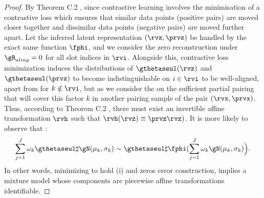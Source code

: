 \documentclass{article} %
\theoremstyle{plain}
\theoremstyle{definition}
\theoremstyle{remark}
\numberwithin{equation}{section}
\begin{document}
\begin{proof}
    By Theorem C.2 \citep{kivva2022identifiability}, since contrastive learning involves the minimisation of a contrastive loss which ensures that similar data points (positive pairs) are moved closer together and dissimilar data points (negative pairs) are moved further apart. Let the inferred latent representation $(\rvz, \prvz)$ be handled by the exact same function $\fphi$, and we consider the zero reconstruction under $\gR_{aling}=0$ for all slot indices in $\rvi$. Alongside this, contrastive loss minimization induces the distributions of \( \gthetaseul(\rvz) \) and \( \gthetaseul(\prvz)\) to become indistinguishable on $i \in \rvi$ to be well-aligned, apart from for $k \notin \rvi$, but as we consider the  on the sufficient partial pairing that will cover this factor $k$ in another pairing sample of the pair $(\rvx,\prvx)$. Thus, according to Theorem C.2 \citep{kivva2022identifiability}, there must exist an invertible affine transformation \( \rvh \) such that \( \rvh(\rvz) \equiv \prvz \rvz) \). It is more likely to observe that :
    \begin{align}
        \sum_{j=1}^{J} \omega_{k}\gthetaseul\sharp\gN(\mu_{k},\sigma_{k})
        \sim
        \gthetaseul\sharp\fphi(\sum_{j=1}^{J} \omega_{k}\gN(\mu_{k},\sigma_{k})\Big).
    \end{align}
    In other words, minimizing to hold (i) and zeros error construction, implies a mixture model whose components are piecewise affine transformations identifiable.  
    

\end{proof}
\end{document}
